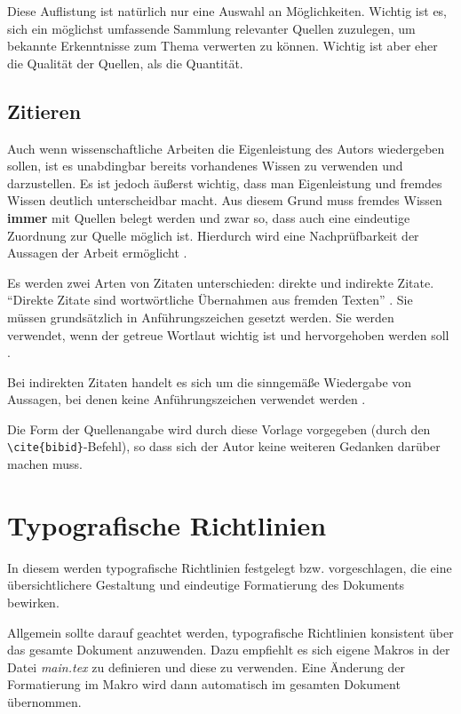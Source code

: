 Diese Auflistung ist natürlich nur eine Auswahl an Möglichkeiten. Wichtig ist es, sich ein möglichst umfassende Sammlung relevanter Quellen zuzulegen, um bekannte Erkenntnisse zum Thema verwerten zu können. Wichtig ist aber eher die Qualität der Quellen, als die Quantität.


\subsection{Zitieren}
\label{sec:Zitieren}

Auch wenn wissenschaftliche Arbeiten die Eigenleistung des Autors wiedergeben sollen, ist es unabdingbar bereits vorhandenes Wissen zu verwenden und darzustellen. Es ist jedoch äußerst wichtig, dass man Eigenleistung und fremdes Wissen deutlich unterscheidbar macht. Aus diesem Grund muss fremdes Wissen \textbf{immer} mit Quellen belegt werden und zwar so, dass auch eine eindeutige Zuordnung zur Quelle möglich ist. Hierdurch wird eine Nachprüfbarkeit der Aussagen der Arbeit ermöglicht \cite{Voss}.

Es werden zwei Arten von Zitaten unterschieden: direkte und indirekte Zitate. \enquote{Direkte Zitate sind wortwörtliche Übernahmen aus fremden Texten} \cite{Voss}. Sie müssen grundsätzlich in Anführungszeichen gesetzt werden. Sie werden verwendet, wenn der getreue Wortlaut wichtig ist und hervorgehoben werden soll \cite{Voss}.

Bei indirekten Zitaten handelt es sich um die sinngemäße Wiedergabe von Aussagen, bei denen keine Anführungszeichen verwendet werden \cite{Voss}.

Die Form der Quellenangabe wird durch diese Vorlage vorgegeben (durch den \verb|\cite{bibid}|-Befehl), so dass sich der Autor keine weiteren Gedanken darüber machen muss.

\section{Typografische Richtlinien}
\label{cha:Typografische_Richtlinien}

In diesem  werden typografische Richtlinien festgelegt bzw. vorgeschlagen, die eine übersichtlichere Gestaltung und eindeutige Formatierung des Dokuments bewirken.

Allgemein sollte darauf geachtet werden, typografische Richtlinien konsistent über das gesamte Dokument anzuwenden. Dazu empfiehlt es sich eigene Makros in der Datei \textit{main.tex} zu definieren und diese zu verwenden. Eine Änderung der Formatierung im Makro wird dann automatisch im gesamten Dokument übernommen.

